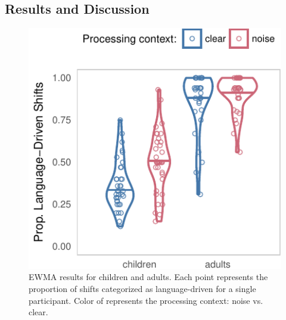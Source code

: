 \documentclass[10pt, letterpaper]{article}
\newenvironment{CodeChunk}{}{}
\begin{document}
\subsection{Results and Discussion}\label{results-and-discussion}

\begin{CodeChunk}
\begin{figure}[t]

{\centering \includegraphics[width=0.8\linewidth]{figs/ewma_violin_plot-1} 

}

\caption[EWMA results for children and adults]{EWMA results for children and adults. Each point represents the proportion of shifts categorized as language-driven for a single participant. Color of represents the processing context: noise vs. clear.}\label{fig:ewma_violin_plot}
\end{figure}
\end{CodeChunk}
\end{document}
